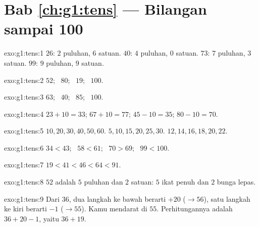 \section*{Bab \ref{ch:g1:tens} --- Bilangan sampai 100}

\begin{solution}{exo:g1:tens:1}
$26$: $2$ puluhan, $6$ satuan. $40$: $4$ puluhan, $0$ satuan. $73$:
$7$ puluhan, $3$ satuan. $99$: $9$ puluhan, $9$ satuan.
\end{solution}

\begin{solution}{exo:g1:tens:2}
$52$; \ $80$; \ $19$; \ $100$.
\end{solution}

\begin{solution}{exo:g1:tens:3}
$63$; \ $40$; \ $85$; \ $100$.
\end{solution}

\begin{solution}{exo:g1:tens:4}
$23 + 10 = 33$; \quad $67 + 10 = 77$; \quad $45 - 10 = 35$; \quad
$80 - 10 = 70$.
\end{solution}

\begin{solution}{exo:g1:tens:5}
$10, 20, 30, 40, 50, 60$. \quad $5, 10, 15, 20, 25, 30$. \quad
$12, 14, 16, 18, 20, 22$.
\end{solution}

\begin{solution}{exo:g1:tens:6}
$34 < 43$; \ $58 < 61$; \ $70 > 69$; \ $99 < 100$.
\end{solution}

\begin{solution}{exo:g1:tens:7}
$19 < 41 < 46 < 64 < 91$.
\end{solution}

\begin{solution}{exo:g1:tens:8}
$52$ adalah $5$ puluhan dan $2$ satuan: $5$ ikat penuh dan $2$ bunga
lepas.
\end{solution}

\begin{solution}{exo:g1:tens:9}
Dari $36$, dua langkah ke bawah berarti $+20$ ($\to 56$), satu
langkah ke kiri berarti $-1$ ($\to 55$). Kamu mendarat di $55$.
Perhitungannya adalah $36 + 20 - 1$, yaitu $36 + 19$.

\end{solution}

